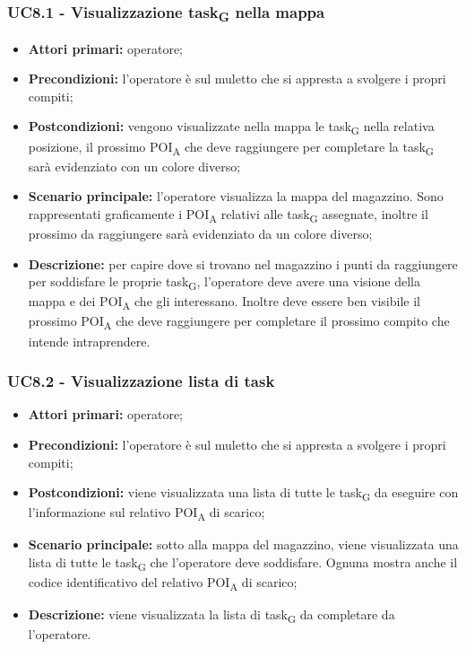 \subsubsection{UC8.1 - Visualizzazione task\textsubscript{G} nella mappa}
\begin{itemize}
	\item 	\textbf{Attori primari:} operatore;
	\item 	\textbf{Precondizioni:} l'operatore è sul muletto che si appresta a svolgere i propri compiti;
	\item 	\textbf{Postcondizioni:} vengono visualizzate nella mappa le task\textsubscript{G} nella relativa posizione, il prossimo POI\textsubscript{A} che deve raggiungere per completare la task\textsubscript{G} sarà evidenziato con un colore diverso;
	\item 	\textbf{Scenario principale:} l'operatore visualizza la mappa del magazzino. Sono rappresentati graficamente i POI\textsubscript{A} relativi alle task\textsubscript{G} assegnate, inoltre il prossimo da raggiungere sarà evidenziato da un colore diverso;
	\item 	\textbf{Descrizione:} per capire dove si trovano nel magazzino i punti da raggiungere per soddisfare le proprie task\textsubscript{G}, l'operatore deve avere una visione della mappa e dei POI\textsubscript{A} che gli interessano. Inoltre deve essere ben visibile il prossimo POI\textsubscript{A} che deve raggiungere per completare il prossimo compito che intende intraprendere.
\end{itemize}



\subsubsection{UC8.2 - Visualizzazione lista di task}
\begin{itemize}
	\item 	\textbf{Attori primari:} operatore;
	\item 	\textbf{Precondizioni:} l'operatore è sul muletto che si appresta a svolgere i propri compiti;
	\item 	\textbf{Postcondizioni:} viene visualizzata una lista di tutte le task\textsubscript{G} da eseguire con l'informazione sul relativo POI\textsubscript{A} di scarico;
	\item 	\textbf{Scenario principale:} sotto alla mappa del magazzino, viene visualizzata una lista di tutte le task\textsubscript{G} che l'operatore deve soddisfare. Ognuna mostra anche il codice identificativo del relativo POI\textsubscript{A} di scarico;
	\item 	\textbf{Descrizione:} viene visualizzata la lista di task\textsubscript{G} da completare da l'operatore.
\end{itemize}

